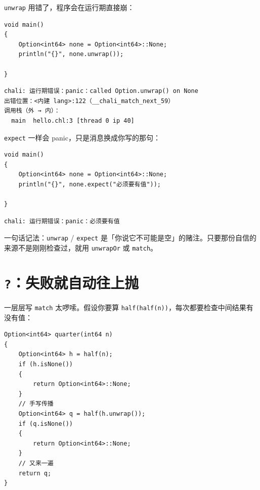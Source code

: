\texttt{unwrap} 用错了，程序会在运行期直接崩：

\par
\medskip
\begin{lstlisting}[style=chali]
void main()
{
    Option<int64> none = Option<int64>::None;
    println("{}", none.unwrap());

}
\end{lstlisting}
\par
\medskip

\par
\medskip
\begin{lstlisting}[style=out]
chali: 运行期错误：panic：called Option.unwrap() on None
出错位置：<内建 lang>:122（__chali_match_next_59）
调用栈（外 → 内）：
  main  hello.chl:3 [thread 0 ip 40]
\end{lstlisting}
\par
\medskip

\texttt{expect} 一样会 panic，只是消息换成你写的那句：

\par
\medskip
\begin{lstlisting}[style=chali]
void main()
{
    Option<int64> none = Option<int64>::None;
    println("{}", none.expect("必须要有值"));

}
\end{lstlisting}
\par
\medskip

\par
\medskip
\begin{lstlisting}[style=out]
chali: 运行期错误：panic：必须要有值
\end{lstlisting}
\par
\medskip

一句话记法：\texttt{unwrap} / \texttt{expect} 是「你说它不可能是空」的赌注。只要那份自信的来源不是刚刚检查过，就用 \texttt{unwrap\allowbreak{}Or} 或 \texttt{match}。

\section{\texttt{?}：失败就自动往上抛}

一层层写 \texttt{match} 太啰嗦。假设你要算 \texttt{half(\allowbreak{}half(\allowbreak{}n)\allowbreak{})\allowbreak{}}，每次都要检查中间结果有没有值：

\par
\medskip
\begin{lstlisting}[style=chali]
Option<int64> quarter(int64 n)
{
    Option<int64> h = half(n);
    if (h.isNone())
    {
        return Option<int64>::None;
    }
    // 手写传播
    Option<int64> q = half(h.unwrap());
    if (q.isNone())
    {
        return Option<int64>::None;
    }
    // 又来一遍
    return q;
}
\end{lstlisting}
\par
\medskip

